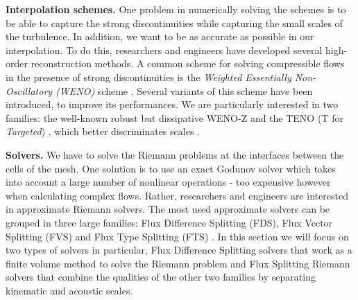 \noindent
\textbf{Interpolation schemes.} 
\label{sec_interpolations}
One problem in numerically solving the schemes is to be able to capture the strong discontinuities while capturing the small scales of the turbulence. In addition, we want to be as accurate as possible in our interpolation. To do this, researchers and engineers have developed several high-order reconstruction methods. A common scheme for solving compressible flows in the presence of strong discontinuities is the \textit{Weighted Essentially Non-Oscillatory (WENO)} scheme \cite{liu1994weighted}. Several variants of this scheme have been
introduced,
to improve its performances\cite{jiang1996efficient}\cite{hu2010adaptive}\cite{henrick2005mapped}.
We are particularly interested in two families: the well-known robust but dissipative WENO-Z \cite{borges2008improved} and the TENO (T for \emph{Targeted}) \cite{fu2016family}, which better discriminates scales \cite{hu2011scale}.

\noindent
\textbf{Solvers.}
We have to solve the Riemann problems at the interfaces between the cells of the mesh.
One solution is to use an exact Godunov solver \cite{toro2013riemann} which takes into account a large number of nonlinear operations - too expensive however when calculating complex flows. 
Rather, researchers and engineers are interested in approximate Riemann solvers. The most used approximate solvers can be grouped in three large families: Flux Difference Splitting (FDS), Flux Vector Splitting (FVS) and Flux Type Splitting (FTS) \cite{toro2013riemann}.
In this section we will focus on two types of solvers in particular, Flux Difference Splitting solvers that work as a finite volume method to solve the Riemann problem and Flux Splitting Riemann solvers that combine the qualities of the other two families by separating kinematic and acoustic scales.

